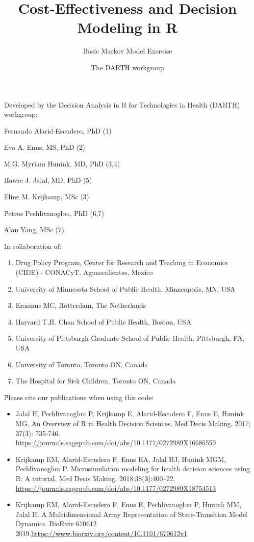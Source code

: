 \documentclass[]{article}
\title{Cost-Effectiveness and Decision Modeling in R}
\subtitle{Basic Markov Model Exercise}
\author{The DARTH workgroup}
\date{}
\providecommand{\tightlist}{%
  \setlength{\itemsep}{0pt}\setlength{\parskip}{0pt}}
\begin{document}
\maketitle

Developed by the Decision Analysis in R for Technologies in Health
(DARTH) workgroup:

Fernando Alarid-Escudero, PhD (1)

Eva A. Enns, MS, PhD (2)

M.G. Myriam Hunink, MD, PhD (3,4)

Hawre J. Jalal, MD, PhD (5)

Eline M. Krijkamp, MSc (3)

Petros Pechlivanoglou, PhD (6,7)

Alan Yang, MSc (7)

In collaboration of:

\begin{enumerate}
\def\labelenumi{\arabic{enumi}.}
\tightlist
\item
  Drug Policy Program, Center for Research and Teaching in Economics
  (CIDE) - CONACyT, Aguascalientes, Mexico
\item
  University of Minnesota School of Public Health, Minneapolis, MN, USA
\item
  Erasmus MC, Rotterdam, The Netherlands
\item
  Harvard T.H. Chan School of Public Health, Boston, USA
\item
  University of Pittsburgh Graduate School of Public Health, Pittsburgh,
  PA, USA
\item
  University of Toronto, Toronto ON, Canada
\item
  The Hospital for Sick Children, Toronto ON, Canada
\end{enumerate}

Please cite our publications when using this code:

\begin{itemize}
\item
  Jalal H, Pechlivanoglou P, Krijkamp E, Alarid-Escudero F, Enns E,
  Hunink MG. An Overview of R in Health Decision Sciences. Med Decis
  Making. 2017; 37(3): 735-746.
  \url{https://journals.sagepub.com/doi/abs/10.1177/0272989X16686559}
\item
  Krijkamp EM, Alarid-Escudero F, Enns EA, Jalal HJ, Hunink MGM,
  Pechlivanoglou P. Microsimulation modeling for health decision
  sciences using R: A tutorial. Med Decis Making. 2018;38(3):400--22.
  \url{https://journals.sagepub.com/doi/abs/10.1177/0272989X18754513}
\item
  Krijkamp EM, Alarid-Escudero F, Enns E, Pechlivanoglou P, Hunink MM,
  Jalal H. A Multidimensional Array Representation of State-Transition
  Model Dynamics. BioRxiv 670612
  2019.\url{https://www.biorxiv.org/content/10.1101/670612v1}
\end{itemize}
\end{document}
